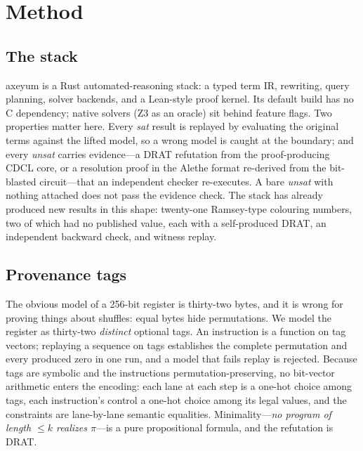 \section{Method}
\label{sec:method}

\subsection{The stack}

axeyum is a Rust automated-reasoning stack: a typed term IR, rewriting, query planning, solver backends, and a Lean-style proof kernel. Its default build has no C dependency; native solvers (Z3 as an oracle) sit behind feature flags. Two properties matter here. Every \emph{sat} result is replayed by evaluating the original terms against the lifted model, so a wrong model is caught at the boundary; and every \emph{unsat} carries evidence---a DRAT refutation from the proof-producing CDCL core, or a resolution proof in the Alethe format re-derived from the bit-blasted circuit---that an independent checker re-executes. A bare \emph{unsat} with nothing attached does not pass the evidence check. The stack has already produced new results in this shape: twenty-one Ramsey-type colouring numbers, two of which had no published value, each with a self-produced DRAT, an independent backward check, and witness replay.

\subsection{Provenance tags}

The obvious model of a 256-bit register is thirty-two bytes, and it is wrong for proving things about shuffles: equal bytes hide permutations. We model the register as thirty-two \emph{distinct} optional tags. An instruction is a function on tag vectors; replaying a sequence on tags establishes the complete permutation and every produced zero in one run, and a model that fails replay is rejected. Because tags are symbolic and the instructions permutation-preserving, no bit-vector arithmetic enters the encoding: each lane at each step is a one-hot choice among tags, each instruction's control a one-hot choice among its legal values, and the constraints are lane-by-lane semantic equalities. Minimality---\emph{no program of length $\le k$ realizes $\pi$}---is a pure propositional formula, and the refutation is DRAT.


